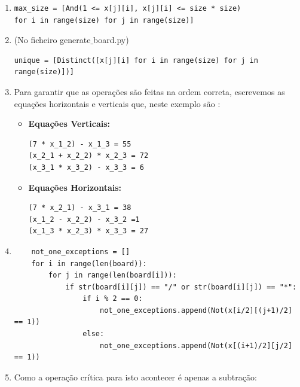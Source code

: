 \documentclass{article}
\begin{document}
 \begin{enumerate}
 \item 
\begin{verbatim}
max_size = [And(1 <= x[j][i], x[j][i] <= size * size) 
for i in range(size) for j in range(size)]
\end{verbatim}

 \item \small{(No ficheiro generate$\_$board.py)}

\begin{verbatim}
unique = [Distinct([x[j][i] for i in range(size) for j in range(size)])]
\end{verbatim}

 \item Para garantir que as operações são feitas na ordem correta, escrevemos as equações horizontais e verticais que, neste exemplo são : \\
\begin{itemize}
\item {\bf{Equações Verticais:}}
\begin{verbatim}
(7 * x_1_2) - x_1_3 = 55
(x_2_1 + x_2_2) * x_2_3 = 72
(x_3_1 * x_3_2) - x_3_3 = 6
\end{verbatim}
\item {\bf{Equações Horizontais:}}
\begin{verbatim}
(7 * x_2_1) - x_3_1 = 38
(x_1_2 - x_2_2) - x_3_2 =1
(x_1_3 * x_2_3) * x_3_3 = 27
\end{verbatim}
\end{itemize}

\item 
\small{
\begin{verbatim}
    not_one_exceptions = []
    for i in range(len(board)):
        for j in range(len(board[i])):
            if str(board[i][j]) == "/" or str(board[i][j]) == "*":
                if i % 2 == 0:
                    not_one_exceptions.append(Not(x[i/2][(j+1)/2] == 1))
                else:
                    not_one_exceptions.append(Not(x[(i+1)/2][j/2] == 1))
\end{verbatim}
}
\newpage

\item Como a operação crítica para isto acontecer é apenas a subtração: 


\end{enumerate}
\end{document}
